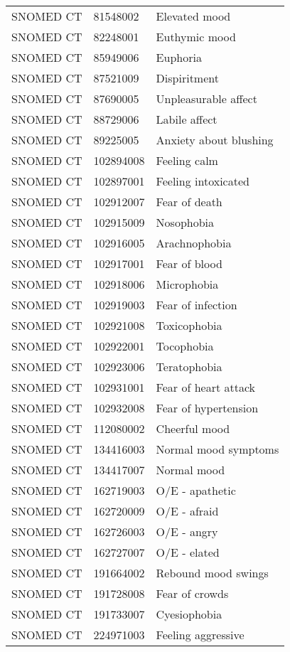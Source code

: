 \begin{longtable}{p{}p{}p{}}
  SNOMED CT & 81548002 & Elevated mood \\ 
  SNOMED CT & 82248001 & Euthymic mood \\ 
  SNOMED CT & 85949006 & Euphoria \\ 
  SNOMED CT & 87521009 & Dispiritment \\ 
  SNOMED CT & 87690005 & Unpleasurable affect \\ 
  SNOMED CT & 88729006 & Labile affect \\ 
  SNOMED CT & 89225005 & Anxiety about blushing \\ 
  SNOMED CT & 102894008 & Feeling calm \\ 
  SNOMED CT & 102897001 & Feeling intoxicated \\ 
  SNOMED CT & 102912007 & Fear of death \\ 
  SNOMED CT & 102915009 & Nosophobia \\ 
  SNOMED CT & 102916005 & Arachnophobia \\ 
  SNOMED CT & 102917001 & Fear of blood \\ 
  SNOMED CT & 102918006 & Microphobia \\ 
  SNOMED CT & 102919003 & Fear of infection \\ 
  SNOMED CT & 102921008 & Toxicophobia \\ 
  SNOMED CT & 102922001 & Tocophobia \\ 
  SNOMED CT & 102923006 & Teratophobia \\ 
  SNOMED CT & 102931001 & Fear of heart attack \\ 
  SNOMED CT & 102932008 & Fear of hypertension \\ 
  SNOMED CT & 112080002 & Cheerful mood \\ 
  SNOMED CT & 134416003 & Normal mood symptoms \\ 
  SNOMED CT & 134417007 & Normal mood \\ 
  SNOMED CT & 162719003 & O/E - apathetic \\ 
  SNOMED CT & 162720009 & O/E - afraid \\ 
  SNOMED CT & 162726003 & O/E - angry \\ 
  SNOMED CT & 162727007 & O/E - elated \\ 
  SNOMED CT & 191664002 & Rebound mood swings \\ 
  SNOMED CT & 191728008 & Fear of crowds \\ 
  SNOMED CT & 191733007 & Cyesiophobia \\ 
  SNOMED CT & 224971003 & Feeling aggressive \\ 

\end{longtable}
